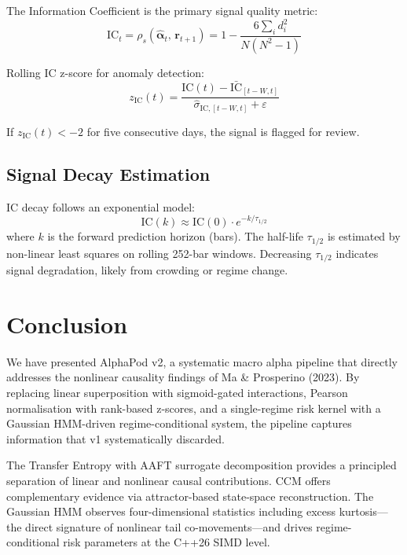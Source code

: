 \documentclass[12pt,a4paper]{article}
\newcommand{\bm}[1]{\boldsymbol{#1}}
\begin{document}
The Information Coefficient is the primary signal quality metric:
\begin{equation}
    \text{IC}_t = \rho_s(\hat{\bm{\alpha}}_t,\, \bm{r}_{t+1})
    = 1 - \frac{6\sum_i d_i^2}{N(N^2-1)}
\end{equation}

Rolling IC z-score for anomaly detection:
\begin{equation}
    z_{\text{IC}}(t) = \frac{\text{IC}(t) - \bar{\text{IC}}_{[t-W,t]}}{\hat{\sigma}_{\text{IC},[t-W,t]} + \varepsilon}
\end{equation}

If $z_{\text{IC}}(t) < -2$ for five consecutive days, the signal is flagged for review.

\subsection{Signal Decay Estimation}

IC decay follows an exponential model:
\begin{equation}
    \text{IC}(k) \approx \text{IC}(0) \cdot e^{-k/\tau_{1/2}}
\end{equation}
where $k$ is the forward prediction horizon (bars). The half-life $\tau_{1/2}$
is estimated by non-linear least squares on rolling 252-bar windows. Decreasing
$\tau_{1/2}$ indicates signal degradation, likely from crowding or regime change.

\section{Conclusion}

We have presented AlphaPod v2, a systematic macro alpha pipeline that directly
addresses the nonlinear causality findings of Ma \& Prosperino (2023). By
replacing linear superposition with sigmoid-gated interactions, Pearson
normalisation with rank-based z-scores, and a single-regime risk kernel with
a Gaussian HMM-driven regime-conditional system, the pipeline captures
information that v1 systematically discarded.

The Transfer Entropy with AAFT surrogate decomposition provides a principled
separation of linear and nonlinear causal contributions. CCM offers complementary
evidence via attractor-based state-space reconstruction. The Gaussian HMM
observes four-dimensional statistics including excess kurtosis—the direct
signature of nonlinear tail co-movements—and drives regime-conditional risk
parameters at the C++26 SIMD level.
\end{document}
